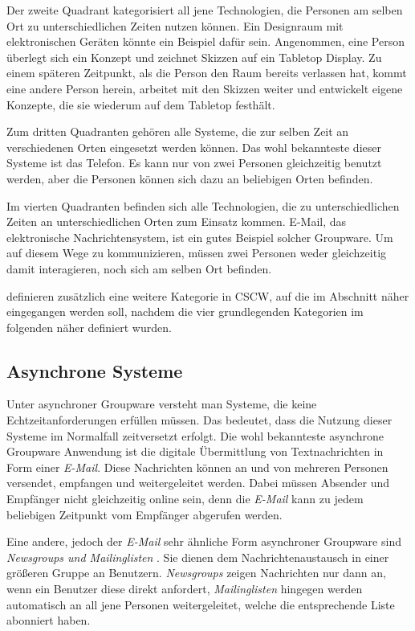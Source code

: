 Der zweite Quadrant kategorisiert all jene Technologien, die Personen am selben Ort zu unterschiedlichen Zeiten nutzen können. Ein Designraum mit elektronischen Geräten könnte ein Beispiel dafür sein. Angenommen, eine Person überlegt sich ein Konzept und zeichnet Skizzen auf ein Tabletop Display. Zu einem späteren Zeitpunkt, als die Person den Raum bereits verlassen hat, kommt eine andere Person herein, arbeitet mit den Skizzen weiter und entwickelt eigene Konzepte, die sie wiederum auf dem Tabletop festhält. 

Zum dritten Quadranten gehören alle Systeme, die zur selben Zeit an verschiedenen Orten eingesetzt werden können. Das wohl bekannteste dieser Systeme ist das Telefon. Es kann nur von zwei Personen gleichzeitig benutzt werden, aber die Personen können sich dazu an beliebigen Orten befinden.

Im vierten Quadranten befinden sich alle Technologien, die zu unterschiedlichen Zeiten an unterschiedlichen Orten zum Einsatz kommen. E-Mail, das elektronische Nachrichtensystem, ist ein gutes Beispiel solcher Groupware. Um auf diesem Wege zu kommunizieren, müssen zwei Personen weder gleichzeitig damit interagieren, noch sich am selben Ort befinden. 

\medskip\citeauthor{Gerlicher:2007p241} definieren zusätzlich eine weitere Kategorie in \ac{CSCW}, auf die im Abschnitt  näher eingegangen werden soll, nachdem die vier grundlegenden Kategorien im folgenden näher definiert wurden.

\subsection{Asynchrone Systeme} 

Unter asynchroner Groupware versteht man Systeme, die keine Echtzeitanforderungen erfüllen müssen. Das bedeutet, dass die Nutzung dieser Systeme im Normalfall zeitversetzt erfolgt. Die wohl bekannteste asynchrone Groupware Anwendung ist die digitale Übermittlung von Textnachrichten in Form einer \emph{E-Mail}. Diese Nachrichten können an und von mehreren Personen versendet, empfangen und weitergeleitet werden. Dabei müssen Absender und Empfänger nicht gleichzeitig online sein, denn die \emph{E-Mail} kann zu jedem beliebigen Zeitpunkt vom Empfänger abgerufen werden.

Eine andere, jedoch der \emph{E-Mail} sehr ähnliche Form asynchroner Groupware sind \emph{Newsgroups und Mailinglisten} \citep{Gerlicher:2007p241}. Sie dienen dem Nachrichtenaustausch in einer größeren Gruppe an Benutzern. \emph{Newsgroups} zeigen Nachrichten nur dann an, wenn ein Benutzer diese direkt anfordert, \emph{Mailinglisten} hingegen werden automatisch an all jene Personen weitergeleitet, welche die entsprechende Liste abonniert haben.

